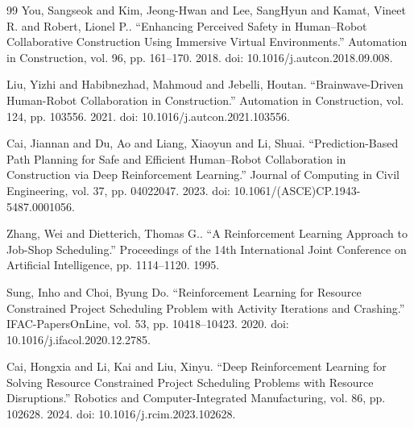 \documentclass[preprint,12pt]{elsarticle}
\begin{document}
\begin{thebibliography}{99}
 You, Sangseok and Kim, Jeong-Hwan and Lee, SangHyun and Kamat, Vineet R. and Robert, Lionel P.. ``Enhancing Perceived Safety in Human--Robot Collaborative Construction Using Immersive Virtual Environments.'' Automation in Construction, vol. 96, pp. 161--170. 2018. doi: 10.1016/j.autcon.2018.09.008.

 Liu, Yizhi and Habibnezhad, Mahmoud and Jebelli, Houtan. ``Brainwave-Driven Human-Robot Collaboration in Construction.'' Automation in Construction, vol. 124, pp. 103556. 2021. doi: 10.1016/j.autcon.2021.103556.

 Cai, Jiannan and Du, Ao and Liang, Xiaoyun and Li, Shuai. ``Prediction-Based Path Planning for Safe and Efficient Human--Robot Collaboration in Construction via Deep Reinforcement Learning.'' Journal of Computing in Civil Engineering, vol. 37, pp. 04022047. 2023. doi: 10.1061/(ASCE)CP.1943-5487.0001056.

 Zhang, Wei and Dietterich, Thomas G.. ``A Reinforcement Learning Approach to Job-Shop Scheduling.'' Proceedings of the 14th International Joint Conference on Artificial Intelligence, pp. 1114--1120. 1995.

 Sung, Inho and Choi, Byung Do. ``Reinforcement Learning for Resource Constrained Project Scheduling Problem with Activity Iterations and Crashing.'' IFAC-PapersOnLine, vol. 53, pp. 10418--10423. 2020. doi: 10.1016/j.ifacol.2020.12.2785.

 Cai, Hongxia and Li, Kai and Liu, Xinyu. ``Deep Reinforcement Learning for Solving Resource Constrained Project Scheduling Problems with Resource Disruptions.'' Robotics and Computer-Integrated Manufacturing, vol. 86, pp. 102628. 2024. doi: 10.1016/j.rcim.2023.102628.
\end{thebibliography}
\end{document}
